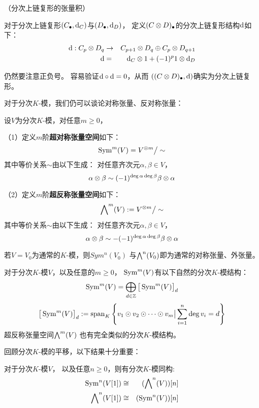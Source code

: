 \begin{definition}（分次上链复形的张量积）

对于分次上链复形$(C_{\bullet},\mathrm{d}_C)$与$(D_{\bullet},\mathrm{d}_D)$，
定义$(C\otimes D)_{\bullet}$的分次上链复形结构$\mathrm{d}$如下：
\begin{eqnarray*}
\mathrm{d}:C_p\otimes D_q &\to& C_{p+1}\otimes D_q\oplus C_p\otimes D_{q+1}\\
\mathrm{d} &=&\mathrm{d}_C\otimes 1+(-1)^p1\otimes \mathrm{d}_D
\end{eqnarray*}
\label{分次上链复形的张量积-def}
\end{definition}

仍然要注意正负号。
容易验证$\mathrm{d}\circ\mathrm{d}=0$，从而
$((C\otimes D)_{\bullet},\mathrm{d})$确实为分次上链复形。

对于分次$K$-模，我们仍可以谈论对称张量、反对称张量：

\begin{definition}设$V$为分次$K$-模，对任意$m\geq0$，

（1）定义$m$阶\textbf{超对称张量空间}如下：
$$\operatorname{Sym}^m(V)=V^{\otimes m}\big/\sim$$
其中等价关系$\sim$由以下生成：
对任意齐次元$\alpha,\beta\in V$，
$$\alpha\otimes\beta\sim(-1)^{\deg\alpha\deg\beta}\beta\otimes\alpha$$

（2）定义$m$阶\textbf{超反称张量空间}如下：
$$\bigwedge\nolimits^{m}(V):=V^{\otimes m}\big/\sim$$
其中等价关系$\sim$由以下生成：
对任意齐次元$\alpha,\beta\in V$，
$$\alpha\otimes\beta\sim-(-1)^{\deg\alpha\deg\beta}\beta\otimes\alpha$$
\end{definition}

若$V=V_0$为通常的$K$-模，则$Sym^n(V_0)$
与$\bigwedge\nolimits^{n}(V_0)$即为通常的对称张量、外张量。

对于分次$K$-模$V$，以及任意的$m\geq 0$，
$\operatorname{Sym}^m(V)$有以下自然的分次$K$-模结构：
$$\operatorname{Sym}^m(V)=\bigoplus_{d\in\mathbb{Z}}
\big[\operatorname{Sym}^m(V)\big]_d$$
$$\big[\operatorname{Sym}^m(V)\big]_d
:=\operatorname{span}_K\left\{
           v_1\odot v_2\odot\cdots\odot v_m
           \big|\sum\limits_{i=1}^n\deg v_i=d
         \right\}
$$
超反称张量空间$\bigwedge\nolimits^{m}(V)$
也有完全类似的分次$K$-模结构。

回顾分次$K$-模的平移，以下结果十分重要：


\begin{prop}对于分次$K$-模$V$，
以及任意$n\geq0$，则有分次$K$-模同构:
\begin{eqnarray*}
\operatorname{Sym}^n(V[1])&\cong&(\bigwedge\nolimits^{n}(V))[n]\\
\bigwedge\nolimits^{n}(V[1])&\cong&(\operatorname{Sym}^n(V))[n]
\end{eqnarray*}
\end{prop}

